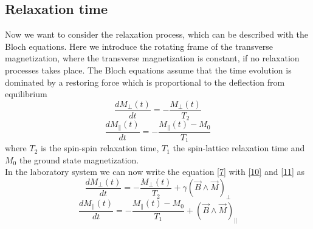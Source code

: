 \subsection{Relaxation time}\label{relax}
Now we want to consider the relaxation process, which can be described with the Bloch equations. Here we introduce the rotating frame of the transverse magnetization, where the transverse magnetization is constant, if no relaxation processes takes place. The Bloch equations assume that the time evolution is dominated by a restoring force which is proportional to the deflection from equilibrium
\begin{equation}
	\label{10}
	\dfrac{dM_{\perp}(t)}{dt} = - \dfrac{M_{\perp}(t)}{T_{2}}
\end{equation}
\begin{equation}
	\label{11}
	\dfrac{dM_{\parallel}(t)}{dt} = - \dfrac{M_{\parallel}(t)-M_{0}}{T_{1}}
\end{equation}
where $T_{2}$ is the spin-spin relaxation time, $T_{1}$ the spin-lattice relaxation time and $M_{0}$ the ground state magnetization.
\vspace{3mm}\\
In the laboratory system we can now write the equation \eqref{7} with \eqref{10} and \eqref{11} as
\begin{equation}
	\label{12}
	\dfrac{dM_{\perp}(t)}{dt} = - \dfrac{M_{\perp}(t)}{T_{2}} + \gamma ( \vec{B} \wedge \vec{M})_{\perp}
\end{equation}
\begin{equation}
	\label{13}
	\dfrac{dM_{\parallel}(t)}{dt} = - \dfrac{M_{\parallel}(t)-M_{0}}{T_{1}} + ( \vec{B} \wedge  \vec{M})_{\parallel}
\end{equation}

